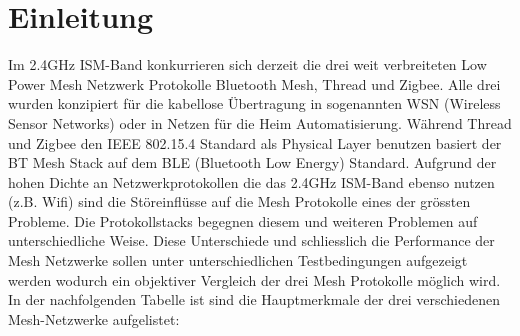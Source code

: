 \newpage
\section{Einleitung}
Im 2.4GHz ISM-Band konkurrieren sich derzeit die drei weit verbreiteten Low Power Mesh Netzwerk Protokolle Bluetooth Mesh, Thread und Zigbee. Alle drei wurden konzipiert für die kabellose Übertragung in sogenannten WSN (Wireless Sensor Networks) oder in Netzen für die Heim Automatisierung. Während Thread und Zigbee den IEEE 802.15.4 Standard als Physical Layer benutzen basiert der BT Mesh Stack auf dem BLE (Bluetooth Low Energy) Standard. Aufgrund der hohen Dichte an Netzwerkprotokollen die das 2.4GHz ISM-Band ebenso nutzen (z.B. Wifi) sind die Störeinflüsse auf die Mesh Protokolle eines der grössten Probleme. Die Protokollstacks begegnen diesem und weiteren Problemen auf unterschiedliche Weise. Diese Unterschiede und schliesslich die Performance der Mesh Netzwerke sollen unter unterschiedlichen Testbedingungen aufgezeigt werden wodurch ein objektiver Vergleich der drei Mesh Protokolle möglich wird. In der nachfolgenden Tabelle ist sind die Hauptmerkmale der drei verschiedenen Mesh-Netzwerke aufgelistet:

